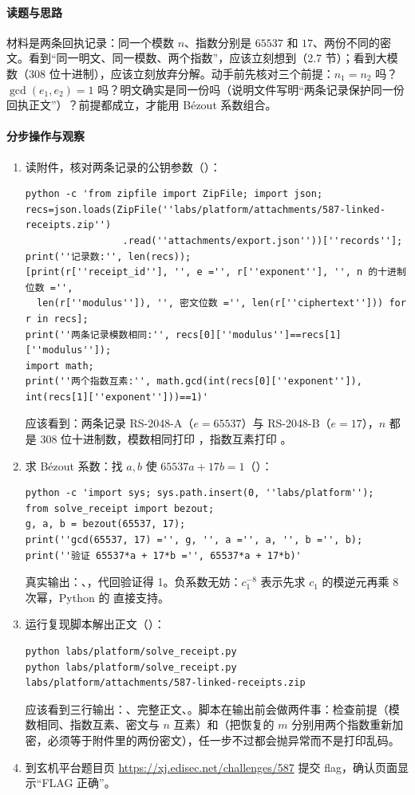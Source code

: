 \documentclass[UTF8,12pt,oneside]{ctexbook}
\begin{document}
\paragraph{读题与思路}材料是两条回执记录：同一个模数 $n$、指数分别是 $65537$ 和 $17$、两份不同的密文。看到“同一明文、同一模数、两个指数”，应该立刻想到（2.7 节）；看到大模数（308 位十进制），应该立刻放弃分解。动手前先核对三个前提：$n_1 = n_2$ 吗？$\gcd(e_1, e_2) = 1$ 吗？明文确实是同一份吗（说明文件写明“两条记录保护同一份回执正文”）？前提都成立，才能用 Bézout 系数组合。

\paragraph{分步操作与观察}
\begin{enumerate}[label=\arabic*.]
\item 读附件，核对两条记录的公钥参数（）：
\begin{lstlisting}
python -c 'from zipfile import ZipFile; import json;
recs=json.loads(ZipFile(''labs/platform/attachments/587-linked-receipts.zip'')
                 .read(''attachments/export.json''))[''records''];
print(''记录数:'', len(recs));
[print(r[''receipt_id''], '', e ='', r[''exponent''], '', n 的十进制位数 ='',
  len(r[''modulus'']), '', 密文位数 ='', len(r[''ciphertext''])) for r in recs];
print(''两条记录模数相同:'', recs[0][''modulus'']==recs[1][''modulus'']);
import math;
print(''两个指数互素:'', math.gcd(int(recs[0][''exponent'']), int(recs[1][''exponent'']))==1)'
\end{lstlisting}
应该看到：两条记录 RS-2048-A（$e = 65537$）与 RS-2048-B（$e = 17$），$n$ 都是 308 位十进制数，模数相同打印 ，指数互素打印 。
\item 求 Bézout 系数：找 $a, b$ 使 $65537a + 17b = 1$（）：
\begin{lstlisting}
python -c 'import sys; sys.path.insert(0, ''labs/platform'');
from solve_receipt import bezout;
g, a, b = bezout(65537, 17);
print(''gcd(65537, 17) ='', g, '', a ='', a, '', b ='', b);
print(''验证 65537*a + 17*b ='', 65537*a + 17*b)'
\end{lstlisting}
真实输出：、，代回验证得 1。负系数无妨：$c_1^{-8}$ 表示先求 $c_1$ 的模逆元再乘 8 次幂，Python 的  直接支持。
\item 运行复现脚本解出正文（）：
\begin{lstlisting}
python labs/platform/solve_receipt.py
python labs/platform/solve_receipt.py labs/platform/attachments/587-linked-receipts.zip
\end{lstlisting}
应该看到三行输出：、完整正文、。脚本在输出前会做两件事：检查前提（模数相同、指数互素、密文与 $n$ 互素）和（把恢复的 $m$ 分别用两个指数重新加密，必须等于附件里的两份密文），任一步不过都会抛异常而不是打印乱码。
\item 到玄机平台题目页 \url{https://xj.edisec.net/challenges/587} 提交 flag，确认页面显示“FLAG 正确”。
\end{enumerate}
\end{document}
